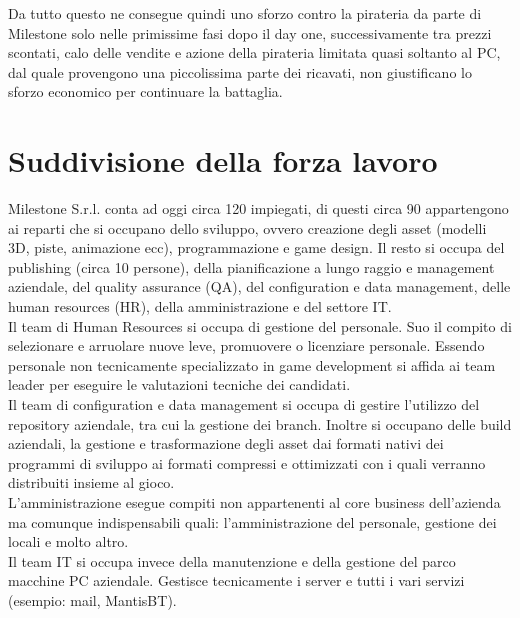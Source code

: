 Da tutto questo ne consegue quindi uno sforzo contro la pirateria da parte di Milestone solo nelle primissime fasi dopo il day one, successivamente tra prezzi scontati, calo delle vendite e azione della pirateria limitata quasi soltanto al PC, dal quale provengono una piccolissima parte dei ricavati, non giustificano lo sforzo economico per continuare la battaglia.

\section{Suddivisione della forza lavoro}

Milestone S.r.l. conta ad oggi circa 120 impiegati, di questi circa 90 appartengono ai reparti che si occupano dello sviluppo, ovvero creazione degli asset (modelli 3D, piste, animazione ecc), programmazione e game design. Il resto si occupa del publishing (circa 10 persone), della pianificazione a lungo raggio e management aziendale, del quality assurance (QA), del configuration e data management, delle human resources (HR), della amministrazione e del settore IT.\\

Il team di Human Resources si occupa di gestione del personale. Suo il compito di selezionare e arruolare nuove leve, promuovere o licenziare personale. Essendo personale non tecnicamente specializzato in game development si affida ai team leader per eseguire le valutazioni tecniche dei candidati.\\

Il team di configuration e data management si occupa di gestire l'utilizzo del repository aziendale, tra cui la gestione dei branch. Inoltre si occupano delle build aziendali, la gestione e trasformazione degli asset dai formati nativi dei programmi di sviluppo ai formati compressi e ottimizzati con i quali verranno distribuiti insieme al gioco.\\

L'amministrazione esegue compiti non appartenenti al core business dell'azienda ma comunque indispensabili quali: l'amministrazione del personale, gestione dei locali e molto altro.\\

Il team IT si occupa invece della manutenzione e della gestione del parco macchine PC aziendale. Gestisce tecnicamente i server e tutti i vari servizi (esempio: mail, MantisBT).\\

